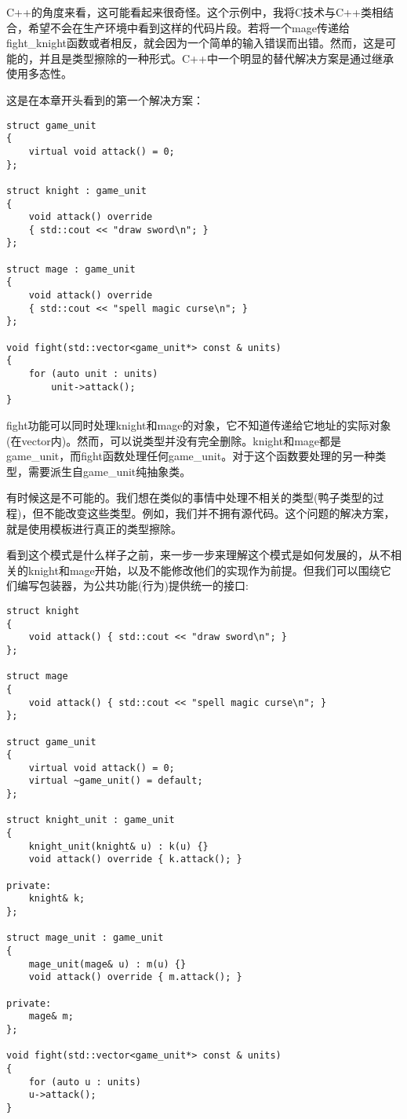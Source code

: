 C++的角度来看，这可能看起来很奇怪。这个示例中，我将C技术与C++类相结合，希望不会在生产环境中看到这样的代码片段。若将一个mage传递给fight\_knight函数或者相反，就会因为一个简单的输入错误而出错。然而，这是可能的，并且是类型擦除的一种形式。C++中一个明显的替代解决方案是通过继承使用多态性。

这是在本章开头看到的第一个解决方案：

\begin{lstlisting}[style=styleCXX]
struct game_unit
{
	virtual void attack() = 0;
};

struct knight : game_unit
{
	void attack() override
	{ std::cout << "draw sword\n"; }
};

struct mage : game_unit
{
	void attack() override
	{ std::cout << "spell magic curse\n"; }
};

void fight(std::vector<game_unit*> const & units)
{
	for (auto unit : units)
		unit->attack();
}
\end{lstlisting}

fight功能可以同时处理knight和mage的对象，它不知道传递给它地址的实际对象(在vector内)。然而，可以说类型并没有完全删除。knight和mage都是game\_unit，而fight函数处理任何game\_unit。对于这个函数要处理的另一种类型，需要派生自game\_unit纯抽象类。

有时候这是不可能的。我们想在类似的事情中处理不相关的类型(鸭子类型的过程)，但不能改变这些类型。例如，我们并不拥有源代码。这个问题的解决方案，就是使用模板进行真正的类型擦除。

看到这个模式是什么样子之前，来一步一步来理解这个模式是如何发展的，从不相关的knight和mage开始，以及不能修改他们的实现作为前提。但我们可以围绕它们编写包装器，为公共功能(行为)提供统一的接口:

\begin{lstlisting}[style=styleCXX]
struct knight
{
	void attack() { std::cout << "draw sword\n"; }
};

struct mage
{
	void attack() { std::cout << "spell magic curse\n"; }
};

struct game_unit
{
	virtual void attack() = 0;
	virtual ~game_unit() = default;
};

struct knight_unit : game_unit
{
	knight_unit(knight& u) : k(u) {}
	void attack() override { k.attack(); }
	
private:
	knight& k;
};

struct mage_unit : game_unit
{
	mage_unit(mage& u) : m(u) {}
	void attack() override { m.attack(); }
	
private:
	mage& m;
};

void fight(std::vector<game_unit*> const & units)
{
	for (auto u : units)
	u->attack();
}
\end{lstlisting}

